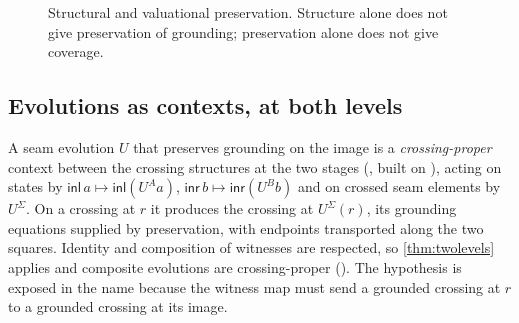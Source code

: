 \begin{figure}[t]
\centering
{}
\caption{Structural and valuational preservation. Structure alone does not give preservation of grounding; preservation alone does not give coverage.}
\label{fig:dynamic}
\end{figure}

\subsection{Evolutions as contexts, at both levels}
A seam evolution $U$ that preserves grounding on the image is a \emph{crossing-proper} context between the crossing structures at the two stages (, built on ), acting on states by $\mathsf{inl}\,a \mapsto \mathsf{inl}(U^A a)$, $\mathsf{inr}\,b \mapsto \mathsf{inr}(U^B b)$ and on crossed seam elements by $U^\Sigma$. On a crossing at $r$ it produces the crossing at $U^\Sigma(r)$, its grounding equations supplied by preservation, with endpoints transported along the two squares. Identity and composition of witnesses are respected, so \cref{thm:twolevels} applies and composite evolutions are crossing-proper (). The hypothesis is exposed in the name because the witness map must send a grounded crossing at $r$ to a grounded crossing at its image.

